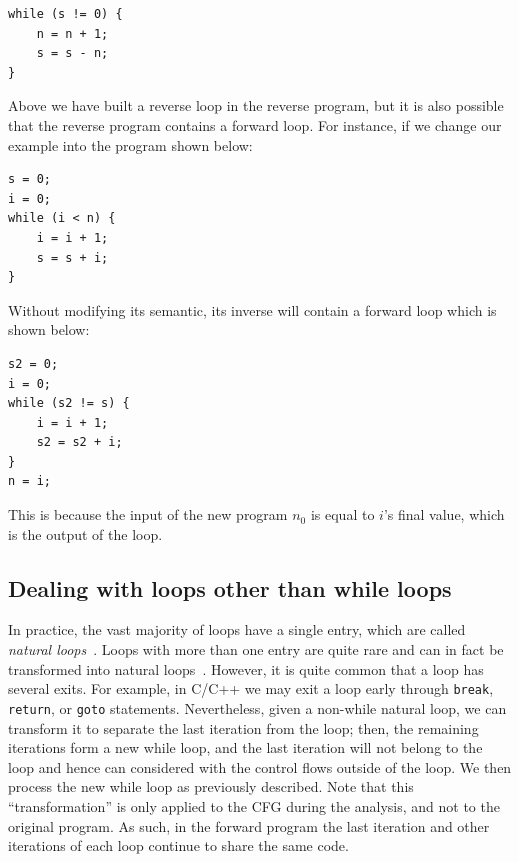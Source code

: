 \begin{lstlisting}
while (s != 0) {
    n = n + 1;
    s = s - n;
}
\end{lstlisting}


Above we have built a reverse loop in the reverse program, but it is also possible that the reverse program contains a forward loop. 
For instance, if we change our example into the program shown  below:


\begin{lstlisting}
s = 0;
i = 0;
while (i < n) {
    i = i + 1;
    s = s + i;
}
\end{lstlisting}


Without modifying its semantic, its inverse will contain a forward loop which is shown below:

\begin{lstlisting}
s2 = 0;
i = 0;
while (s2 != s) {
    i = i + 1;
    s2 = s2 + i;
}
n = i;
\end{lstlisting}

 This is because the input of the new program $n_0$ is equal to $i$'s final value, which is the output of the loop. 


\subsection{Dealing with loops other than while loops}
\label{sec:other-loops}

In practice, the vast majority of loops have a single entry, which are called \emph{natural loops}~\cite{Muchnick}. 
Loops with more than one entry are quite rare and can in fact be transformed into natural loops~\cite{Muchnick}. 
However, it is quite common that a loop has several exits. 
For example, in C/C++ we may exit a loop early through \texttt{break}, \texttt{return}, or \texttt{goto} statements.
Nevertheless, given a non-while natural loop, we can transform it to separate the last iteration from the loop;
then, the remaining iterations form a new while loop, and the last iteration will not belong to the loop and hence can considered with the control flows outside of the loop. 
We then process the new while loop as previously described.
Note that this ``transformation'' is only applied to the CFG during the analysis, and not to the original program.
As such, in the forward program \Forward the last iteration and other iterations of each loop continue to share the same code.


